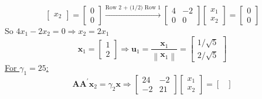 \begin{enumerate}[label=(\alph*)]
\[\begin{bmatrix}
                    x_2
                \end{bmatrix}
                =
                \begin{bmatrix}
                    0 \\
                    0
                \end{bmatrix}
                \overset{\text{Row 2 + (1/2) Row 1}}{\longrightarrow}
                \begin{bmatrix}
                    4 & -2 \\
                    0 & 0
                \end{bmatrix}
                \begin{bmatrix}
                    x_1 \\
                    x_2
                \end{bmatrix}
                =
                \begin{bmatrix}
                    0 \\
                    0
                \end{bmatrix}
            \]
            So $4x_1 - 2x_2 = 0 \Rightarrow x_2 = 2x_1$
            \[
                \mathbf{x}_1
                =
                \begin{bmatrix}
                    1 \\
                    2
                \end{bmatrix}
                \Rightarrow
                \mathbf{u}_1
                =
                \frac{\mathbf{x}_1}{\left\|\mathbf{x}_1\right\|}
                =
                \begin{bmatrix}
                    1/\sqrt{5} \\
                    2/\sqrt{5}
                \end{bmatrix}
            \]
            \underline{For $\gamma_1 = 25$:}
            \[
                \mathbf{A}\mathbf{A}^\prime\mathbf{x}_2 = \gamma_2\mathbf{x}
                \Rightarrow
                \begin{bmatrix}
                    24 & -2 \\
                    -2 & 21
                \end{bmatrix}
                \begin{bmatrix}
                    x_1 \\
                    x_2
                \end{bmatrix}
                =
                \begin{bmatrix}

\end{bmatrix}\]
\end{enumerate}
